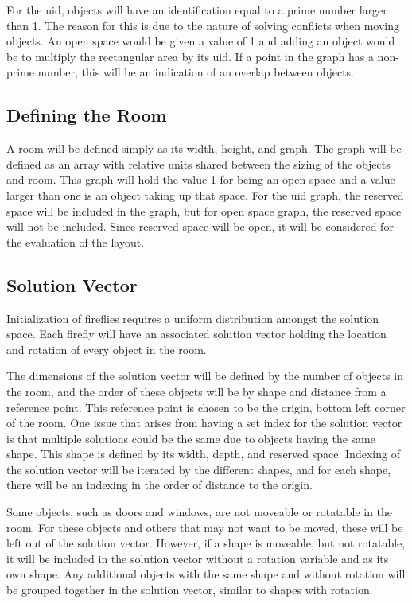 \documentclass[sigconf,authordraft]{acmart}
\begin{document}
    For the uid, objects will have an identification equal to a prime number larger than 1. The reason for this is due to the nature of solving conflicts when moving objects. An open space would be given a value of 1 and adding an object would be to multiply the rectangular area by its uid. If a point in the graph has a non-prime number, this will be an indication of an overlap between objects.
    

    \subsection{Defining the Room}
    A room will be defined simply as its width, height, and graph. The graph will be defined as an array with relative units shared between the sizing of the objects and room. This graph will hold the value 1 for being an open space and a value larger than one is an object taking up that space. For the uid graph, the reserved space will be included in the graph, but for open space graph, the reserved space will not be included. Since reserved space will be open, it will be considered for the evaluation of the layout.

    \subsection{Solution Vector}
    Initialization of fireflies requires a uniform distribution amongst the solution space. Each firefly will have an associated solution vector holding the location and rotation of every object in the room. 
    
    The dimensions of the solution vector will be defined by the number of objects in the room, and the order of these objects will be by shape and distance from a reference point. This reference point is chosen to be the origin, bottom left corner of the room. One issue that arises from having a set index for the solution vector is that multiple solutions could be the same due to objects having the same shape. This shape is defined by its width, depth, and reserved space. Indexing of the solution vector will be iterated by the different shapes, and for each shape, there will be an indexing in the order of distance to the origin.
    
    Some objects, such as doors and windows, are not moveable or rotatable in the room. For these objects and others that may not want to be moved, these will be left out of the solution vector. However, if a shape is moveable, but not rotatable, it will be included in the solution vector without a rotation variable and as its own shape. Any additional objects with the same shape and without rotation will be grouped together in the solution vector, similar to shapes with rotation.
    
\end{document}
